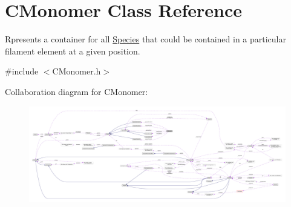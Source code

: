 \hypertarget{classCMonomer}{\section{C\+Monomer Class Reference}
\label{classCMonomer}
}


Rpresents a container for all \hyperlink{classSpecies}{Species} that could be contained in a particular filament element at a given position.  




{\ttfamily \#include $<$C\+Monomer.\+h$>$}



Collaboration diagram for C\+Monomer\+:\nopagebreak
\begin{figure}[H]
\begin{center}
\leavevmode
\includegraphics[width=350pt]{classCMonomer__coll__graph}
\end{center}
\end{figure}
